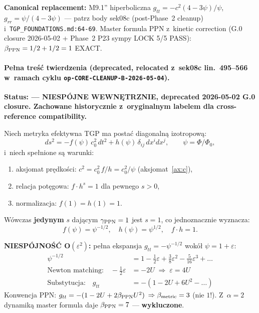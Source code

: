 \textbf{Canonical replacement:} M9.1'' hiperboliczna
$g_{tt} = -c^2(4-3\psi)/\psi$, $g_{rr} = \psi/(4-3\psi)$ —
patrz body sek08c (post-Phase~2 cleanup) i~\texttt{TGP\_FOUNDATIONS.md:64-69}.
Master formula PPN z~kinetic correction (G.0 closure 2026-05-02 + Phase~2 P23
sympy LOCK 5/5 PASS): $\beta_{\rm PPN} = 1/2 + 1/2 = 1$ EXACT.

\paragraph{Pe\l{}na tre\'s\'c twierdzenia (deprecated, relocated z~sek08c
lin.~495--566 w~ramach cyklu \texttt{op-CORE-CLEANUP-B-2026-05-04}).}

\begin{theorem}%
\label{thm:antipodal-uniqueness}
\textbf{Status:  ---
\textbf{NIESP\'OJNE WEWN\k{E}TRZNIE}, deprecated 2026-05-02 G.0 closure.
Zachowane historycznie z~oryginalnym labelem dla cross-reference
compatibility.}

Niech metryka efektywna TGP ma posta\'c diagonaln\k{a} izotropow\k{a}:
\begin{equation}
  ds^2 = -f(\psi)\,c_0^2\,dt^2 + h(\psi)\,\delta_{ij}\,dx^i dx^j,
  \qquad \psi = \Phi/\Phi_0,
  \label{eq:antipodal-metric-ansatz}
\end{equation}
i~niech spe\l{}nione s\k{a} warunki:
\begin{enumerate}[nosep]
  \item[(C1)] aksjomat pr\k{e}dko\'sci: $c^2 = c_0^2\,f/h = c_0^2/\psi$
    (aksjomat~\ref{ax:c}),
  \item[(C2)] relacja pot\k{e}gowa: $f\cdot h^s = 1$ dla pewnego $s > 0$,
  \item[(C3)] normalizacja: $f(1) = h(1) = 1$.
\end{enumerate}
W\'owczas \textbf{jedynym} $s$ daj\k{a}cym
$\gamma_{\rm PPN} = 1$ jest $s = 1$, co jednoznacznie
wyznacza:
\begin{equation}
  \boxed{f(\psi) = \psi^{-1/2},
  \quad h(\psi) = \psi^{1/2},
  \quad f \cdot h = 1.}
  \label{eq:antipodal-unique-solution}
\end{equation}

\textbf{NIESP\'OJNO\'S\'C O$(\varepsilon^2)$:} pe\l{}na ekspansja
$g_{tt} = -\psi^{-1/2}$ wok\'o\l{} $\psi=1+\varepsilon$:
\begin{align*}
  \psi^{-1/2} &= 1 - \tfrac{1}{2}\varepsilon + \tfrac{3}{8}\varepsilon^2
              - \tfrac{5}{16}\varepsilon^3 + \ldots \\
  \text{Newton matching:} \quad -\tfrac{1}{2}\varepsilon &= -2U
  \;\Rightarrow\; \varepsilon = 4U \\
  \text{Substytucja:} \quad g_{tt} &= -(1 - 2U + 6U^2 - \ldots)
\end{align*}
Konwencja PPN: $g_{tt} = -(1 - 2U + 2\beta_{\rm PPN}U^2)$
$\Rightarrow \beta_{\rm metric} = 3$ (nie $1$!). Z~$\alpha=2$ dynamik\k{a}
master formula daje $\beta_{\rm PPN}=7$ — \textbf{wykluczone}.


\end{theorem}
